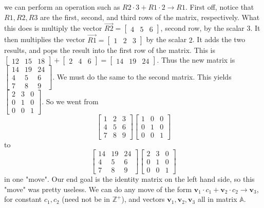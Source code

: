 \documentclass{article}
\begin{document}
we can perform an operation such as $R2\cdot 3+R1\cdot 2\to R1$. First off, notice that $R1, R2, R3$ are the first, second, and third rows of the matrix, respectively. What this does is multiply the vector $\vec{R2}=\begin{bmatrix}4 & 5 & 6\end{bmatrix}$, second row, by the scalar $3$. It then multiplies the vector $\vec{R1}=\begin{bmatrix}1 & 2 & 3\end{bmatrix}$ by the scalar $2$. It adds the two results, and pops the result into the first row of the matrix. This is $\begin{bmatrix}12 & 15 & 18\end{bmatrix}+\begin{bmatrix}2 & 4 & 6\end{bmatrix}=\begin{bmatrix}14 & 19 & 24\end{bmatrix}$. Thus the new matrix is $\begin{bmatrix}14 & 19 & 24 \\ 4 & 5 & 6\\ 7 & 8 & 9\end{bmatrix}$. We must do the same to the second matrix.  This yields $\begin{bmatrix} 2 & 3 & 0 \\ 0 & 1 & 0 \\ 0 & 0 & 1\end{bmatrix}$. So we went from
$$\begin{bmatrix}1 & 2 & 3\\ 4 & 5 & 6 \\ 7 & 8 & 9\end{bmatrix} \begin{bmatrix}1 & 0 & 0 \\ 0 & 1 & 0 \\ 0 & 0 & 1\end{bmatrix}$$
to
$$\begin{bmatrix}14 & 19 & 24 \\ 4 & 5 & 6\\ 7 & 8 & 9\end{bmatrix} \begin{bmatrix} 2 & 3 & 0 \\ 0 & 1 & 0 \\ 0 & 0 & 1\end{bmatrix}$$
in one "move". Our end goal is the identity matrix on the left hand side, so this "move" was pretty useless. We can do any move of the form $\textbf{v}_1\cdot c_1+\textbf{v}_2\cdot c_2\to \textbf{v}_3$, for constant $c_1, c_2$ (need not be in $\mathbb{Z}^{+}$), and vectors $\textbf{v}_1, \textbf{v}_2,\textbf{v}_3$ all in matrix $\mathbb{A}$. 
\end{document}

